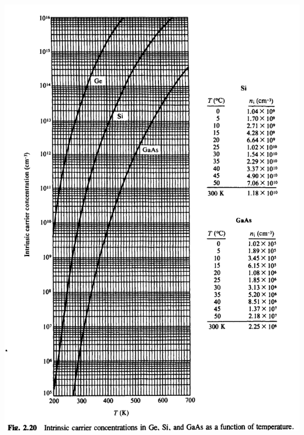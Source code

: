 \begin{multicols}{2}
  \medbreak\noindent\minipage{\columnwidth}
            \includegraphics[width=\columnwidth]{V1Figure2-20.png}
        \endminipage\medbreak
        

\end{multicols}
